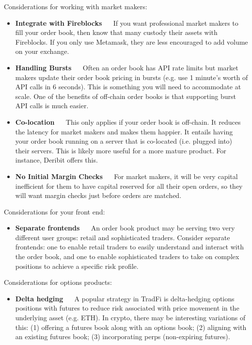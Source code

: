 \documentclass{article}
\begin{document}
Considerations for working with market makers:
\begin{itemize}
    \item \textbf{Integrate with Fireblocks} $\quad$ If you want professional market makers to fill your order book, then know that many custody their assets with Fireblocks. If you only use Metamask, they are less encouraged to add volume on your exchange. 
    \item \textbf{Handling Bursts} $\quad$ Often an order book has API rate limits but market makers update their order book pricing in bursts (e.g. use 1 minute's worth of API calls in 6 seconds). This is something you will need to accommodate at scale. One of the benefits of off-chain order books is that supporting burst API calls is much easier. 
    \item \textbf{Co-location} $\quad$ This only applies if your order book is off-chain. It reduces the latency for market makers and makes them happier. It entails having your order book running on a server that is co-located (i.e. plugged into) their servers. This is likely more useful for a more mature product. For instance, Deribit offers this. 
    \item \textbf{No Initial Margin Checks} $\quad$ For market makers, it will be very capital inefficient for them to have capital reserved for all their open orders, so they will want margin checks just before orders are matched.
\end{itemize}

\noindent Considerations for your front end:
\begin{itemize}
    \item \textbf{Separate frontends} $\quad$ An order book product may be serving two very different user groups: retail and sophisticated traders. Consider separate frontends: one to enable retail traders to easily understand and interact with the order book, and one to enable sophisticated traders to take on complex positions to achieve a specific risk profile. 
\end{itemize}

\noindent Considerations for options products:
\begin{itemize}
    \item \textbf{Delta hedging} $\quad$ A popular strategy in TradFi is delta-hedging options positions with futures to reduce risk associated with price movement in the underlying asset (e.g. ETH). In crypto, there may be interesting variations of this: (1) offering a futures book along with an options book; (2) aligning with an existing futures book; (3) incorporating perps (non-expiring futures).
\end{itemize}
\end{document}
